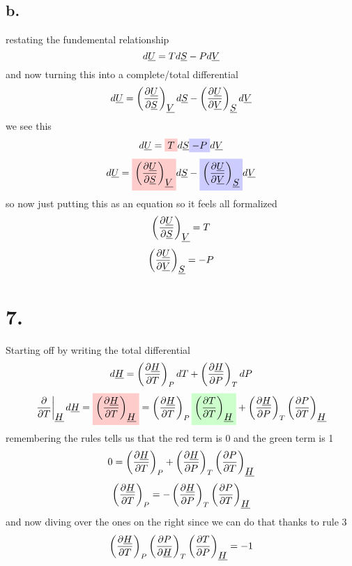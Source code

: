 \documentclass{article}
\begin{document}
\subsection*{b.}
restating the fundemental relationship
\[ d\ub{U} = T d\ub{S} - P d\ub{V} \] 
and now turning this into a complete/total differential
\[ d\ub{U} = \p{\ub{U}}{\ub{S}}{\ub{V}} d\ub{S} - \p{\ub{U}}{\ub{V}}{\ub{S}} d\ub{V} \]
we see this
\[ d\ub{U} = \highlight{red}{T} d\ub{S} \highlight{blue}{- P} d\ub{V} \]
\[ d\ub{U} = \highlight{red}{\p{\ub{U}}{\ub{S}}{\ub{V}}} d\ub{S} - \highlight{blue}{\p{\ub{U}}{\ub{V}}{\ub{S}}} d\ub{V} \]
so now just putting this as an equation so it feels all formalized
\[ \p{\ub{U}}{\ub{S}}{\ub{V}} = T \]
\[ \p{\ub{U}}{\ub{V}}{\ub{S}} = - P \]






\section*{7.}
Starting off by writing the total differential
\[ d\ub{H} = \p{\ub{H}}{T}{P} dT + \p{\ub{H}}{P}{T} dP \]
\[ \pop{T}{\ub{H}} d\ub{H} = \highlight{red}{\p{\ub{H}}{T}{\ub{H}}}  = \p{\ub{H}}{T}{P} \highlight{green}{\p{T}{T}{\ub{H}}} + \p{\ub{H}}{P}{T} \p{P}{T}{\ub{H}} \]
remembering the rules tells us that the red term is 0 and the green term is 1
\[0 = \p{\ub{H}}{T}{P} + \p{\ub{H}}{P}{T} \p{P}{T}{\ub{H}} \]
\[ \p{\ub{H}}{T}{P} = - \p{\ub{H}}{P}{T} \p{P}{T}{\ub{H}}  \]
and now diving over the ones on the right since we can do that thanks to rule 3
\[ \p{\ub{H}}{T}{P} \p{P}{\ub{H}}{T} \p{T}{P}{\ub{H}} = - 1  \]
\end{document}
